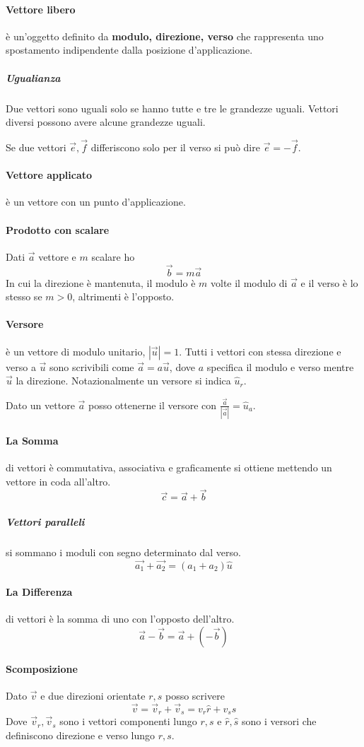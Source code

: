 \paragraph{Vettore libero} è un'oggetto definito da \textbf{modulo, direzione, verso} che rappresenta uno spostamento indipendente dalla posizione d'applicazione.
\subparagraph{Ugualianza} Due vettori sono uguali solo se hanno tutte e tre le grandezze uguali. Vettori diversi possono avere alcune grandezze uguali.

Se due vettori $\vec{e}, \vec{f}$ differiscono solo per il verso si può dire $\vec{e}=-\vec{f}.$
\paragraph{Vettore applicato} è un vettore con un punto d'applicazione.
\paragraph{Prodotto con scalare} Dati $\vec{a}$ vettore e $m$ scalare ho \[\vec{b}=m\vec{a}\]In cui la direzione è mantenuta, il modulo è $m$ volte il modulo di $\vec{a}$ e il verso è lo stesso se $m>0$, altrimenti è l'opposto.
\paragraph{Versore} è un vettore di modulo unitario, $|\vec{u}|=1$. Tutti i vettori con stessa direzione e verso a $\vec{u}$ sono scrivibili come $\vec{a}=a\vec{u}$, dove $a$ specifica il modulo e verso mentre $\vec{u}$ la direzione.
Notazionalmente un versore si indica $\hat{u}_r$.

Dato un vettore $\vec{a}$ posso ottenerne il versore con $\frac{\vec{a}}{|\vec{a}|}=\hat{u}_a$.
\paragraph{La Somma} di vettori è commutativa, associativa e graficamente si ottiene mettendo un vettore in coda all'altro. \[\vec{c}=\vec{a}+\vec{b}\]
\subparagraph{Vettori paralleli} si sommano i moduli con segno determinato dal verso. \[\vec{a_1}+\vec{a_2}=(a_1+a_2)\hat{u}\]
\paragraph{La Differenza} di vettori è la somma di uno con l'opposto dell'altro. \[\vec{a}-\vec{b}=\vec{a}+(-\vec{b})\]
\paragraph{Scomposizione} Dato $\vec{v}$ e due direzioni orientate $r, s$ posso scrivere \[\vec{v}=\vec{v}_r+\vec{v}_s=v_r\hat{r}+v_s\hat{s}\] Dove $\vec{v}_r, \vec{v}_s$ sono i vettori componenti lungo $r,s$ e $\hat{r}, \hat{s}$ sono i versori che definiscono direzione e verso lungo $r,s$.

